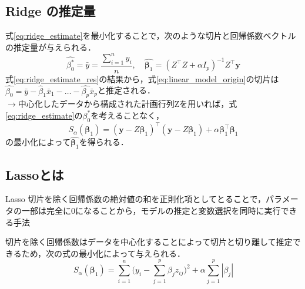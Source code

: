 \documentclass[dvipdfmx, 10pt]{beamer}
\begin{document}
\subsection{Ridge の推定量}
\begin{frame}{\insertsubsection}
        式\eqref{eq:ridge_estimate}を最小化することで，次のような切片と回帰係数ベクトルの推定量が与えられる．
    \begin{equation}
	\hat{\beta_0^*} = \bar{y} = \frac{\sum_{i=1}^{n}{y_i}}{n}, \quad \hat{\bm{\beta}_1} = (Z^{\top}Z + \alpha I_p)^{-1} Z^{\top} \bm{y}
	\label{eq:ridge_estimate_res}
    \end{equation}
    \vspace{10pt}
    式\eqref{eq:ridge_estimate_res}の結果から，式\eqref{eq:linear_model_origin}の切片は$\hat{\beta_0} = \bar{y} - \hat{\beta}_1 \bar{x}_1 - \dots - \hat{\beta_p} \bar{x}_p$と推定される．\\
    $\rightarrow$中心化したデータから構成された計画行列Zを用いれば，式\eqref{eq:ridge_estimate}の$\beta_0^*$を考えることなく，
\begin{equation}
	S_{\alpha}(\bm{\beta}_1) = (\bm{y} - Z \bm{\beta}_1)^{\top}  (\bm{y} - Z\bm{\beta}_1) + \alpha \bm{\beta}_1^{\top} \bm{\beta}_1
	\label{eq:ridge_estimate_beta1hat}
\end{equation}
の最小化によって$\hat{\bm{\beta}_1}$を得られる．
\end{frame}

\subsection{Lassoとは}
\begin{frame}{\insertsubsection}
    \begin{block}{Lasso}
        切片を除く回帰係数の絶対値の和を正則化項としてとることで，パラメータの一部は完全に0になることから，モデルの推定と変数選択を同時に実行できる手法
    \end{block}
    \vspace{10pt}
    切片を除く回帰係数はデータを中心化することによって切片と切り離して推定できるため，次の式の最小化によって与えられる．
    \begin{equation}
        S_{\alpha}(\bm\beta_1) = \sum_{i=1}^{n} \bigl(
        	y_i - \sum_{j=1}^{p} \beta_j z_{ij}
        \bigr)^2 + \alpha \sum_{j=1}^{p}|\beta_j|
    \end{equation}
\end{frame}
\end{document}
